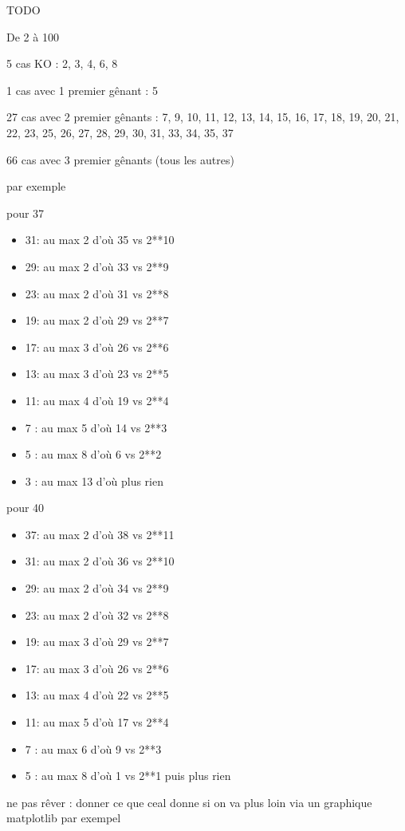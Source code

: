 \leavevmode
\smallskip

TODO

De 2 à 100


5 cas KO : 
2, 3, 4, 6, 8


1 cas avec 1 premier gênant :
5


27 cas avec 2 premier gênants :
7, 9, 10, 11, 12, 13, 14, 15, 16, 17, 18, 19, 20, 21, 22, 23, 25, 26, 27, 28, 29, 30, 31, 33, 34, 35, 37


66 cas avec 3 premier gênants (tous les autres)


par exemple

pour 37

\begin{itemize}
	\item 31: au max 2  d'où 35 vs 2**10
	\item 29: au max 2  d'où 33 vs 2**9
	\item 23: au max 2  d'où 31 vs 2**8
	\item 19: au max 2  d'où 29 vs 2**7
	\item 17: au max 3  d'où 26 vs 2**6
	\item 13: au max 3  d'où 23 vs 2**5
	\item 11: au max 4  d'où 19 vs 2**4
	\item 7 : au max 5  d'où 14 vs 2**3
	\item 5 : au max 8  d'où 6  vs 2**2
	\item 3 : au max 13 d'où plus rien
\end{itemize}
	 
	 
pour 40

\begin{itemize}
	\item 37: au max 2  d'où 38 vs 2**11
	\item 31: au max 2  d'où 36 vs 2**10
	\item 29: au max 2  d'où 34 vs 2**9
	\item 23: au max 2  d'où 32 vs 2**8
	\item 19: au max 3  d'où 29 vs 2**7
	\item 17: au max 3  d'où 26 vs 2**6
	\item 13: au max 4  d'où 22 vs 2**5
	\item 11: au max 5  d'où 17 vs 2**4
	\item 7 : au max 6  d'où 9  vs 2**3
	\item 5 : au max 8  d'où 1  vs 2**1 puis plus rien
\end{itemize}


ne pas rêver : donner ce que ceal donne si on va plus loin via un graphique matplotlib par exempel